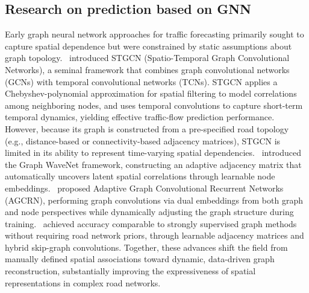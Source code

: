 \documentclass[preprint,12pt,authoryear]{elsarticle}
\begin{document}
\subsection{Research on prediction based on GNN}
Early graph neural network approaches for traffic forecasting primarily sought to capture spatial dependence but were constrained by static assumptions about graph topology.~\cite{yu2018spatio} introduced STGCN (Spatio-Temporal Graph Convolutional Networks), a seminal framework that combines graph convolutional networks (GCNs) with temporal convolutional networks (TCNs). STGCN applies a Chebyshev-polynomial approximation for spatial filtering to model correlations among neighboring nodes, and uses temporal convolutions to capture short-term temporal dynamics, yielding effective traffic-flow prediction performance. However, because its graph is constructed from a pre-specified road topology (e.g., distance-based or connectivity-based adjacency matrices), STGCN is limited in its ability to represent time-varying spatial dependencies.~\cite{wu2019graph} introduced the Graph WaveNet framework, constructing an adaptive adjacency matrix that automatically uncovers latent spatial correlations through learnable node embeddings.~\cite{bai2020adaptive} proposed Adaptive Graph Convolutional Recurrent Networks (AGCRN), performing graph convolutions via dual embeddings from both graph and node perspectives while dynamically adjusting the graph structure during training.~\cite{wu2020connecting} achieved accuracy comparable to strongly supervised graph methods without requiring road network priors, through learnable adjacency matrices and hybrid skip-graph convolutions. Together, these advances shift the field from manually defined spatial associations toward dynamic, data-driven graph reconstruction, substantially improving the expressiveness of spatial representations in complex road networks.
\end{document}
